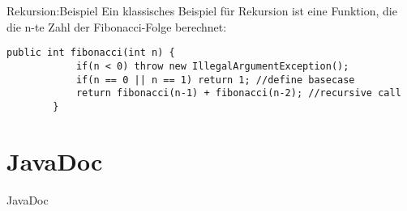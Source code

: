 \begin{frame}[fragile]{Rekursion:Beispiel}
    Ein klassisches Beispiel für Rekursion ist eine Funktion, die die n-te Zahl der Fibonacci-Folge berechnet:
    \begin{lstlisting}[gobble=8]
        public int fibonacci(int n) {
            if(n < 0) throw new IllegalArgumentException();
            if(n == 0 || n == 1) return 1; //define basecase
            return fibonacci(n-1) + fibonacci(n-2); //recursive call
        }
    \end{lstlisting}
\end{frame}

\section{JavaDoc}

\begin{frame}{JavaDoc}

\end{frame}

